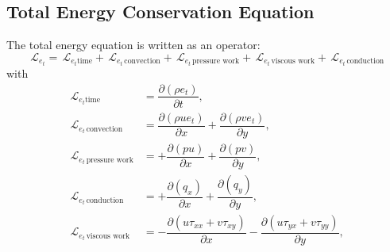 \documentclass[10pt]{article}
\newcommand{\Diff}[2] {\dfrac{\partial( #1)}{\partial #2}}
\newcommand{\Lo}{\,\mathcal{L}}
\newcommand{\convection}{\,\text{convection}}
\newcommand{\conduction}{\,\text{conduction}}
\newcommand{\workpressure}{\,\text{pressure work}}
\newcommand{\workviscous}{\,\text{viscous work}}
\begin{document}
\subsection{Total Energy Conservation Equation}
The total energy equation is written as an operator:
\begin{equation*}
 \label{eq:ns1d_14}
\Lo_{e_t} = \Lo_{e_t \text{time}} + \Lo_{e_t \convection} + \Lo_{e_t \workpressure}+ \Lo_{e_t \workviscous} + \Lo_{e_t \conduction} 
\end{equation*}
with
\begin{equation*}
\begin{split}
\Lo_{e_t \text{time}}&= \Diff{\rho e_t}{t} ,\\
\Lo_{e_t \convection} &= \Diff{\rho u e_t}{x}+\Diff{\rho v e_t}{y},\\
\Lo_{e_t \workpressure} &=+\Diff{pu}{x}+\Diff{pv}{y} ,\\
\Lo_{e_t \conduction} &=+\Diff{q_x}{x} +\Diff{q_y}{y},\\ 
\Lo_{e_t \workviscous} &= -\Diff{u\tau_{xx}+v\tau_{xy}}{x}-\Diff{u\tau_{yx}+v\tau_{yy}}{y},\\
 \end{split}
\end{equation*}
\end{document}
